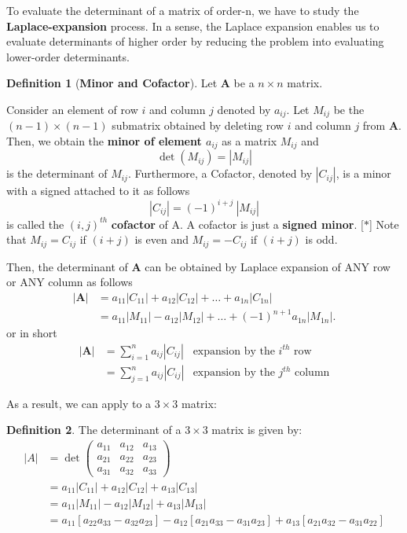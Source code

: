 \documentclass[10pt,a4paper]{book}
\theoremstyle{definition}\newtheorem{definition}{Definition}
\theoremstyle{definition}\newtheorem{fact}{Fact}
\theoremstyle{definition}\newtheorem{ex}{Ex.}
\theoremstyle{definition}\newtheorem{project}{Project}
\theoremstyle{definition}\newtheorem{problem}{Problem}
\theoremstyle{definition}\newtheorem{example}{Example}
\numberwithin{theorem}{chapter}
\numberwithin{corollary}{chapter}
\numberwithin{assumption}{chapter}
\numberwithin{definition}{chapter}
\numberwithin{prop}{chapter}
\numberwithin{notation}{chapter}
\numberwithin{problem}{chapter}
\numberwithin{example}{chapter}
\numberwithin{fact}{chapter}
\numberwithin{ex}{chapter}
\newenvironment{fdefinition}
{\begin{mdframed}\begin{definition}}
		{\end{definition}\end{mdframed}}
\def\A{\mathbf A}
\begin{document}
	To evaluate the determinant of a matrix of order-n, we have to study the \textbf{Laplace-expansion} process. In a sense, the Laplace expansion enables us to evaluate determinants of higher order by reducing the problem into evaluating lower-order determinants.
	
	\begin{fdefinition}[\textbf{Minor and Cofactor}]
		Let $\A$ be a $n\times n$ matrix. 
		
		Consider an element of row $i$ and column $j$ denoted by $a_{ij}$. Let $M_{ij}$ be the $(n-1) \times (n-1)$ submatrix obtained by deleting row $i$ and column $j$ from $\A$. Then, we obtain the \textbf{minor of element $a_{ij}$} as a matrix $M_{ij}$ and
		\begin{equation*}
			\det(M_{ij}) = |M_{ij}|
		\end{equation*}
		is the determinant of $M_{ij}$. Furthermore, a Cofactor, denoted by $|C_{ij}|$, is a minor with a signed attached to it as follows
		\begin{equation*}
			|C_{ij}| = (-1)^{i+j} \ |M_{ij}|
		\end{equation*}
		is called the $(i,j)^{th}$ \textbf{cofactor} of A. A cofactor is just a \textbf{signed minor}.  [$\ast$] Note that $M_{ij} = C_{ij}$ if $(i+j)$ is even and $M_{ij} = -C_{ij}$ if $(i+j)$ is odd.
		
		Then, the determinant of $\A$ can be obtained by Laplace expansion of ANY row or ANY column as follows
		\begin{align*}
			|\A| & = a_{11} |C_{11}| + a_{12} |C_{12}| + \dots + a_{1n} |C_{1n}|            \\
			& = a_{11} |M_{11}| - a_{12} |M_{12}| + \dots + (-1)^{n+1} a_{1n} |M_{1n}|. 
		\end{align*}
		or in short
		\begin{align*}
			|\A| &= \sum^n_{i=1} a_{ij} |C_{ij}| & \text{expansion by the $i^{th}$ row}\\
				 &= \sum^n_{j=1} a_{ij} |C_{ij}| & \text{expansion by the $j^{th}$ column}
		\end{align*} 
	\end{fdefinition}
	
	As a result, we can apply to a $3 \times 3$ matrix:
	\begin{fdefinition}
		The determinant of a $3\times 3$ matrix is given by:
		\begin{align*}
			|A| &= \det \begin{pmatrix}
				a_{11} & a_{12} & a_{13} \\
				a_{21} & a_{22} & a_{23} \\
				a_{31} & a_{32} & a_{33} 
			\end{pmatrix} \\
			&= a_{11} |C_{11}| + a_{12} |C_{12}| + a_{13} |C_{13}| \\
			&= a_{11} |M_{11}| - a_{12} |M_{12}| + a_{13} |M_{13}| \\
			&= a_{11} [a_{22}a_{33} - a_{32}a_{23}] - a_{12}[a_{21}a_{33} - a_{31}a_{23}] + a_{13}[a_{21}a_{32} - a_{31}a_{22}]
		\end{align*}
	\end{fdefinition}
	
\end{document}
